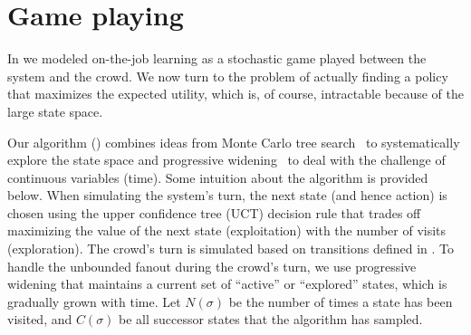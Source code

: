 \section{Game playing}
\label{sec:otj:game-playing}

In  we modeled on-the-job learning as a stochastic game played between the system and the crowd.
We now turn to the problem of actually finding a policy that maximizes the expected utility,
which is, of course, intractable because of the large state space.

Our algorithm () combines ideas from Monte Carlo tree search~\citep{kocsis2006bandit} to systematically explore the state space and 
progressive widening~\citep{coulom2007computing} to deal with the challenge of continuous variables (time).
Some intuition about the algorithm is provided below.
When simulating the system's turn, the next state (and hence action) is chosen using the upper confidence tree (UCT) decision rule that trades off maximizing the value of the next state (exploitation) with the number of visits (exploration).
The crowd's turn is simulated based on transitions defined in .
To handle the unbounded fanout during the crowd's turn, we use progressive widening  
that maintains a current set of ``active'' or ``explored'' states, which is gradually grown with time. 
Let $N(\sigma)$ be the number of times a state has been visited,
and $C(\sigma)$ be all successor states that the algorithm has sampled.


